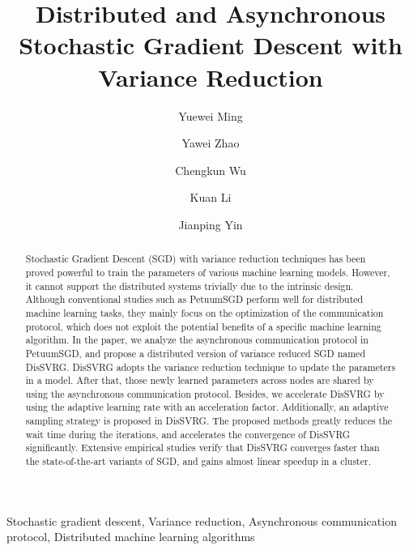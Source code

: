 \documentclass[preprint,review,11pt,a4paper]{elsarticle}
\begin{document}
\begin{frontmatter}

\title{Distributed and Asynchronous Stochastic Gradient Descent with Variance Reduction}

\author[mymainaddress]{Yuewei Ming}

\author[mymainaddress]{Yawei Zhao}
\author[mymainaddress]{Chengkun Wu}
\author[mymainaddress]{Kuan Li}
\author[mysecondaryaddress]{Jianping Yin}
\address[mymainaddress]{College of Computer,\\ National University of Defense Technology, Changsha 410073, China}
\address[mysecondaryaddress]{State Key Laboratory of High Performance Computing,\\ National University of Defense Technology, Changsha, 410073, China}

\begin{abstract}
Stochastic Gradient Descent (SGD) with variance reduction techniques has been proved powerful to train the parameters of various machine learning models. However, it cannot support the distributed systems trivially due to the intrinsic design.  Although conventional studies such as PetuumSGD perform well for distributed machine learning tasks, they mainly focus on the optimization of the communication protocol, which does not exploit the potential benefits of a specific machine learning algorithm. In the paper, we analyze the asynchronous communication protocol in PetuumSGD, and propose a distributed version of variance reduced SGD named DisSVRG. DisSVRG adopts the variance reduction technique to update the parameters in a model. After that,  those newly learned parameters across nodes are shared by using the asynchronous communication protocol. Besides, we accelerate DisSVRG by using the adaptive learning rate with an acceleration factor. Additionally, an adaptive sampling strategy is proposed in DisSVRG. The proposed methods  greatly reduces the wait time during the iterations, and accelerates the convergence of DisSVRG significantly. Extensive empirical studies verify that DisSVRG  converges faster than the state-of-the-art variants of SGD, and gains almost linear speedup in a cluster.
\end{abstract}

\begin{keyword}
Stochastic gradient descent, Variance reduction, Asynchronous communication protocol, Distributed machine learning algorithms
\end{keyword}

\end{frontmatter}
\end{document}
